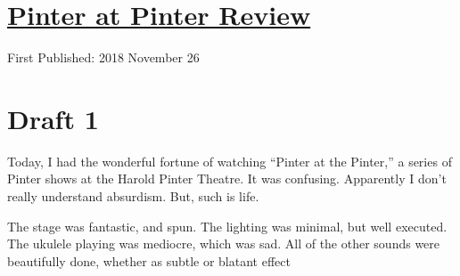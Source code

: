 \documentclass[12pt]{article}[titlepage]
\newcommand{\say}[1]{``#1''}
\newcommand{\1}{\={a}}
\newcommand{\2}{\={e}}
\newcommand{\3}{\={\i}}
\newcommand{\4}{\=o}
\newcommand{\5}{\=u}
\newcommand{\6}{\={A}}
\renewcommand{\,}{\textsuperscript{,}}
\begin{document}
\doublespacing
\section{\href{pinter-at-pinter.html}{Pinter at Pinter Review}}
First Published: 2018 November 26
\section{Draft 1}
Today, I had the wonderful fortune of watching \say{Pinter at the Pinter,} a series of Pinter shows at the Harold Pinter Theatre.
It was confusing.
Apparently I don't really understand absurdism.
But, such is life.

The stage was fantastic, and spun.
The lighting was minimal, but well executed.
The ukulele playing was mediocre, which was sad.
All of the other sounds were beautifully done, whether as subtle or blatant effect
\end{document}
